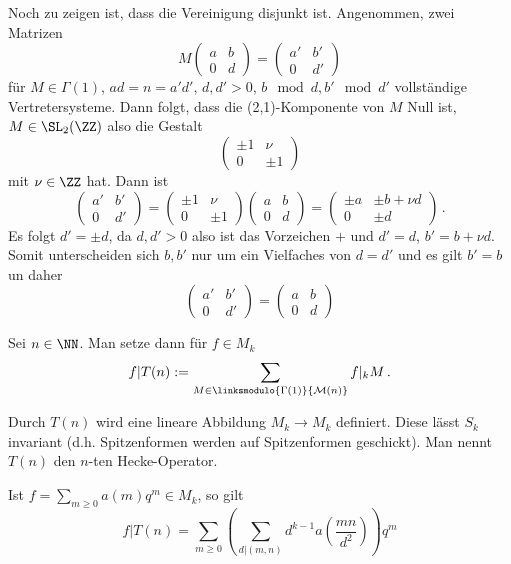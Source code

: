 \begin{bewe}
Noch zu zeigen ist, dass die Vereinigung disjunkt ist. Angenommen, zwei Matrizen
\[
M \begin{pmatrix}
a&b\\0&d
\end{pmatrix} = \begin{pmatrix}
a'&b'\\0&d'
\end{pmatrix}
\]
für $M \in \Gamma(1)$, $ad = n = a'd'$, $d, d' > 0$, $b \mod d, b' \mod d'$ vollständige Vertretersysteme. Dann folgt, dass die (2,1)-Komponente von $M$ Null ist, $M \in \SL_2(\ZZ)$ also die Gestalt
\[
\begin{pmatrix}
\pm 1 & \nu\\
0 & \pm 1
\end{pmatrix}
\]
mit $\nu \in \ZZ$ hat. Dann ist 
\[
\begin{pmatrix}
a' & b'\\ 0 & d'
\end{pmatrix} = \begin{pmatrix}
\pm 1 & \nu\\
0 & \pm 1
\end{pmatrix} \begin{pmatrix}
a & b\\0 & d
\end{pmatrix} = \begin{pmatrix}
\pm a & \pm b + \nu d \\ 0 & \pm d
\end{pmatrix}
\,.
\]
Es folgt $d' = \pm d$, da $d, d' > 0$ also ist das Vorzeichen $+$ und $d' = d$, $b' = b + \nu d$. Somit unterscheiden sich $b, b'$ nur um ein Vielfaches von $d = d'$ und es gilt $b' = b$ un daher
\[
\begin{pmatrix}
a' & b' \\ 0 & d'
\end{pmatrix} = \begin{pmatrix}
a & b \\ 0 & d
\end{pmatrix}
\]
\end{bewe}

\begin{defi}
Sei $n \in \NN$. Man setze dann für $f \in M_k$
\[
f | T(n) := \sum_{M \in \linksmodulo{\Gamma(1)}{\mathcal M (n)}} f |_k M
\,.
\]
\end{defi}

\begin{satz-list}
\item Durch $T(n)$ wird eine lineare Abbildung $M_k \to M_k$ definiert. Diese lässt $S_k$ invariant (d.h. Spitzenformen werden auf Spitzenformen geschickt). Man nennt $T(n)$ den $n$-ten Hecke-Operator.
\item Ist $f = \sum_{m \geq 0} a(m) q^m \in M_k$, so gilt
\[
f | T(n) = \sum_{m \geq 0} \left( \sum_{d | (m,n)} d^{k-1} a\left(\frac{mn}{d^2}\right) \right) q^m
\]
\end{satz-list}

